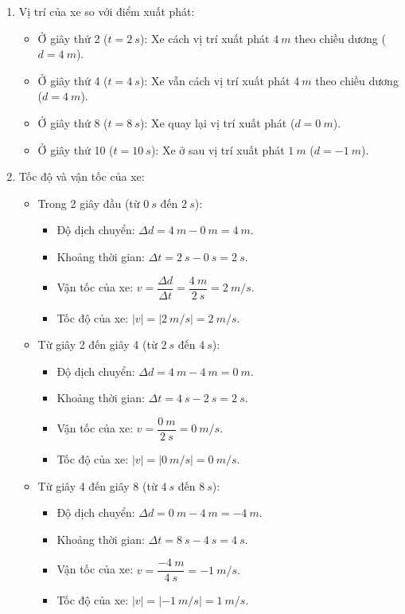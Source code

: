 \begin{vd}
{\begin{enumerate}[label=\alph*)]
			\item Vị trí của xe so với điểm xuất phát:
			\begin{itemize}
				\item Ở giây thứ 2 ($t=\SI{2}{s}$): Xe cách vị trí xuất phát $\SI{4}{m}$ theo chiều dương ($d=\SI{4}{m}$).
				\item Ở giây thứ 4 ($t=\SI{4}{s}$): Xe vẫn cách vị trí xuất phát $\SI{4}{m}$ theo chiều dương ($d=\SI{4}{m}$).
				\item Ở giây thứ 8 ($t=\SI{8}{s}$): Xe quay lại vị trí xuất phát ($d=\SI{0}{m}$).
				\item Ở giây thứ 10 ($t=\SI{10}{s}$): Xe ở sau vị trí xuất phát $\SI{1}{m}$ ($d=\SI{-1}{m}$).
			\end{itemize}
			
			\item Tốc độ và vận tốc của xe:
			\begin{itemize}
				\item Trong 2 giây đầu (từ $\SI{0}{s}$ đến $\SI{2}{s}$):
				\begin{itemize}
					\item Độ dịch chuyển: $\Delta d = \SI{4}{m} - \SI{0}{m} = \SI{4}{m}.$
					\item Khoảng thời gian: $\Delta t = \SI{2}{s} - \SI{0}{s} = \SI{2}{s}.$
					\item Vận tốc của xe: $v = \dfrac{\Delta d}{\Delta t} = \dfrac{\SI{4}{m}}{\SI{2}{s}} = \SI{2}{m/s}.$
					\item Tốc độ của xe: $|v| = |\SI{2}{m/s}| = \SI{2}{m/s}.$
				\end{itemize}
				\item Từ giây 2 đến giây 4 (từ $\SI{2}{s}$ đến $\SI{4}{s}$):
				\begin{itemize}
					\item Độ dịch chuyển: $\Delta d = \SI{4}{m} - \SI{4}{m} = \SI{0}{m}.$
					\item Khoảng thời gian: $\Delta t = \SI{4}{s} - \SI{2}{s} = \SI{2}{s}.$
					\item Vận tốc của xe: $v = \dfrac{\SI{0}{m}}{\SI{2}{s}} = \SI{0}{m/s}.$
					\item Tốc độ của xe: $|v| = |\SI{0}{m/s}| = \SI{0}{m/s}.$
				\end{itemize}
				\item Từ giây 4 đến giây 8 (từ $\SI{4}{s}$ đến $\SI{8}{s}$):
				\begin{itemize}
					\item Độ dịch chuyển: $\Delta d = \SI{0}{m} - \SI{4}{m} = \SI{-4}{m}.$
					\item Khoảng thời gian: $\Delta t = \SI{8}{s} - \SI{4}{s} = \SI{4}{s}.$
					\item Vận tốc của xe: $v = \dfrac{\SI{-4}{m}}{\SI{4}{s}} = \SI{-1}{m/s}.$
					\item Tốc độ của xe: $|v| = |\SI{-1}{m/s}| = \SI{1}{m/s}.$
				\end{itemize}
			\end{itemize}
			

\end{enumerate}}
\end{vd}
